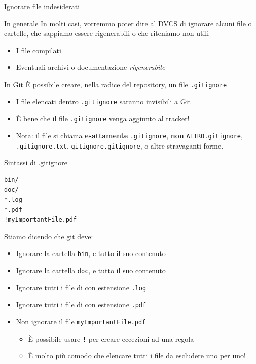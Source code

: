 \documentclass[xcolor=dvipsnames,presentation]{beamer}
\begin{document}
\begin{frame}{Ignorare file indesiderati}
	\begin{block}{In generale}
		In molti casi, vorremmo poter dire al DVCS di ignorare alcuni file o cartelle, che sappiamo
essere rigenerabili o che riteniamo non utili
		\begin{itemize}
			\item I file compilati
			\item Eventuali archivi o documentazione \textit{rigenerabile}
		\end{itemize}
	\end{block}
	\begin{block}{In Git}
		È possibile creare, nella radice del repository, un file \texttt{.gitignore}
		\begin{itemize}
			\item I file elencati dentro \texttt{.gitignore} saranno invisibili a Git
			\item È bene che il file \texttt{.gitignore} venga aggiunto al tracker!
			\item Nota: il file si chiama \textbf{esattamente} \texttt{.gitignore}, \textbf{non}
\texttt{ALTRO.gitignore}, \texttt{.gitignore.txt}, \texttt{gitignore.gitignore}, o altre stravaganti
forme.
		\end{itemize}
	\end{block}
	\begin{block}{Sintassi di .gitignore}
		\begin{Verbatim}[fontsize=\scriptsize]
bin/
doc/
*.log
*.pdf
!myImportantFile.pdf
		\end{Verbatim}
		Stiamo dicendo che git deve:
		\begin{itemize}
			\item Ignorare la cartella \texttt{bin}, e tutto il suo contenuto
			\item Ignorare la cartella \texttt{doc}, e tutto il suo contenuto
			\item Ignorare tutti i file di con estensione \texttt{.log}
			\item Ignorare tutti i file di con estensione \texttt{.pdf}
			\item Non ignorare il file \texttt{myImportantFile.pdf}
			\begin{itemize}
				\item È possibile usare \texttt{!} per creare eccezioni ad una regola
				\item È molto più comodo che elencare tutti i file da escludere uno per uno!
			\end{itemize}

\end{itemize}
\end{block}
\end{frame}
\end{document}
